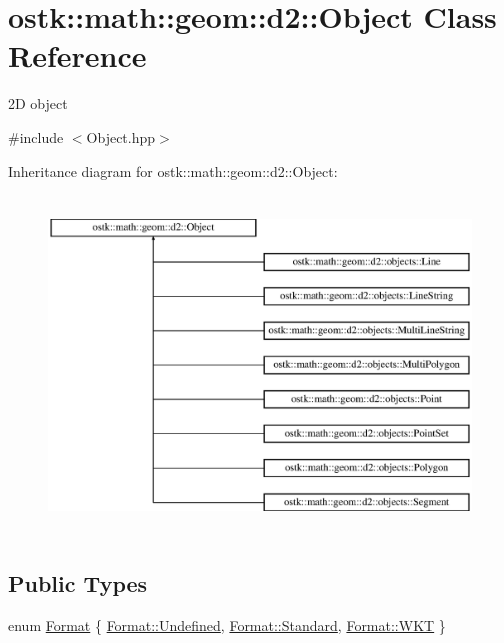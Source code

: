 \hypertarget{classostk_1_1math_1_1geom_1_1d2_1_1_object}{}\section{ostk\+:\+:math\+:\+:geom\+:\+:d2\+:\+:Object Class Reference}
\label{classostk_1_1math_1_1geom_1_1d2_1_1_object}


2D object  




{\ttfamily \#include $<$Object.\+hpp$>$}

Inheritance diagram for ostk\+:\+:math\+:\+:geom\+:\+:d2\+:\+:Object\+:\begin{figure}[H]
\begin{center}
\leavevmode
\includegraphics[height=9.000000cm]{classostk_1_1math_1_1geom_1_1d2_1_1_object}
\end{center}
\end{figure}
\subsection*{Public Types}
\begin{DoxyCompactItemize}
\item 
enum \hyperlink{classostk_1_1math_1_1geom_1_1d2_1_1_object_aa76f9e30caebf4005bafbdff447f66cf}{Format} \{ \hyperlink{classostk_1_1math_1_1geom_1_1d2_1_1_object_aa76f9e30caebf4005bafbdff447f66cfaec0fc0100c4fc1ce4eea230c3dc10360}{Format\+::\+Undefined}, 
\hyperlink{classostk_1_1math_1_1geom_1_1d2_1_1_object_aa76f9e30caebf4005bafbdff447f66cfaeb6d8ae6f20283755b339c0dc273988b}{Format\+::\+Standard}, 
\hyperlink{classostk_1_1math_1_1geom_1_1d2_1_1_object_aa76f9e30caebf4005bafbdff447f66cfa9ab05752e6beff2c783a6046ed592661}{Format\+::\+W\+KT}
 \}
\end{DoxyCompactItemize}
